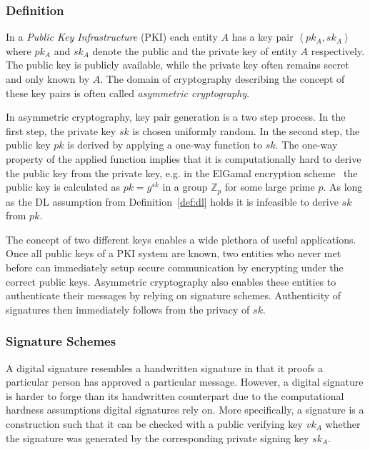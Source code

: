 \subsubsection{Definition}
In a \textit{Public Key Infrastructure} (PKI) each entity $A$ has a key pair $\left< pk_A, sk_A \right>$ where $pk_A$ and $sk_A$ denote the public and the private key of entity $A$ respectively. The public key is publicly available, while the private key often remains secret and only known by $A$. The domain of cryptography describing the concept of these key pairs is often called \textit{asymmetric cryptography}. 

In asymmetric cryptography, key pair generation is a two step process. In the first step, the private key $sk$ is chosen uniformly random. In the second step, the public key $pk$ is derived by applying a one-way function to $sk$. The one-way property of the applied function implies that it is computationally hard to derive the public key from the private key, e.g. in the ElGamal encryption scheme~\cite{art:Elgamal85} the public key is calculated as $pk = g^{sk}$ in a group $\mathbb{Z}_p$ for some large prime $p$. As long as the DL assumption from Definition~\ref{def:dl} holds it is infeasible to derive $sk$ from $pk$.

The concept of two different keys enables a wide plethora of useful applications. Once all public keys of a PKI system are known, two entities who never met before can immediately setup secure communication by encrypting under the correct public keys. Asymmetric cryptography also enables these entities to authenticate their messages by relying on signature schemes. Authenticity of signatures then immediately follows from the privacy of $sk$.

\subsubsection{Signature Schemes}
A digital signature resembles a handwritten signature in that it proofs a particular person has approved a particular message. However, a digital signature is harder to forge than its handwritten counterpart due to the computational hardness assumptions digital signatures rely on. More specifically, a signature is a construction such that it can be checked with a public verifying key $vk_A$ whether the signature was generated by the corresponding private signing key $sk_A$.

